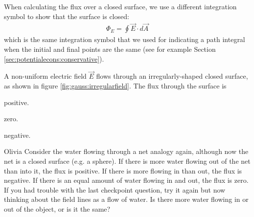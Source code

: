 When calculating the flux over a closed surface, we use a different integration symbol to show that the surface is closed:
\begin{align*}
\Phi_E=\oint \vec E\cdot d\vec A
\end{align*}
which is the same integration symbol that we used for indicating a path integral when the initial and final points are the same (see for example Section \ref{sec:potentialecons:conservative}).
\begin{checkpoint}\label{cp:gauss:unitsofflux}
\begin{MCquestion}{A non-uniform electric field $\vec E$ flows through an irregularly-shaped closed surface, as shown in figure \ref{fig:gauss:irregularfield}. The flux through the surface is}
 \item positive.
 \item zero. \correct
\item negative.
\end{MCquestion}
\end{checkpoint}
\begin{studentOpinion}{Olivia}
Consider the water flowing through a net analogy again, although now the net is a closed surface (e.g. a sphere). If there is more water flowing out of the net than into it, the flux is positive. If there is more flowing in than out, the flux is negative. If there is an equal amount of water flowing in and out, the flux is zero. If you had trouble with the last checkpoint question, try it again but now thinking about the field lines as a flow of water. Is there more water flowing in or out of the object, or is it the same?
\end{studentOpinion}

